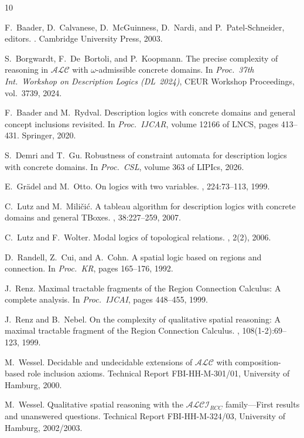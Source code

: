 \documentclass[a4paper,11pt]{article}
\theoremstyle{definition}
\begin{document}

\begin{thebibliography}{10}

F.~Baader, D.~Calvanese, D.~McGuinness, D.~Nardi, and P.~Patel-Schneider,
  editors.
.
\newblock Cambridge University Press, 2003.

S.~Borgwardt, F.~De~Bortoli, and P.~Koopmann.
\newblock The precise complexity of reasoning in {$\mathcal{ALC}$} with
  $\omega$-admissible concrete domains.
\newblock In {\em Proc.\ 37th Int.\ Workshop on Description Logics (DL~2024)},
  CEUR Workshop Proceedings, vol.\ 3739, 2024.

F.~Baader and M.~Rydval.
\newblock Description logics with concrete domains and general concept
  inclusions revisited.
\newblock In {\em Proc.\ IJCAR}, volume 12166 of LNCS, pages 413--431.
  Springer, 2020.

S.~Demri and T.~Gu.
\newblock Robustness of constraint automata for description logics with
  concrete domains.
\newblock In {\em Proc.\ CSL}, volume 363 of LIPIcs, 2026.

E.~Gr\"{a}del and M.~Otto.
\newblock On logics with two variables.
, 224:73--113, 1999.

C.~Lutz and M.~Mili\v{c}i\'{c}.
\newblock A tableau algorithm for description logics with concrete domains and
  general {TBoxes}.
, 38:227--259, 2007.

C.~Lutz and F.~Wolter.
\newblock Modal logics of topological relations.
, 2(2), 2006.

D.~Randell, Z.~Cui, and A.~Cohn.
\newblock A spatial logic based on regions and connection.
\newblock In {\em Proc.\ KR}, pages 165--176, 1992.

J.~Renz.
\newblock Maximal tractable fragments of the {Region Connection Calculus}: A
  complete analysis.
\newblock In {\em Proc.\ IJCAI}, pages 448--455, 1999.

J.~Renz and B.~Nebel.
\newblock On the complexity of qualitative spatial reasoning: A maximal
  tractable fragment of the {Region Connection Calculus}.
, 108(1-2):69--123, 1999.

M.~Wessel.
\newblock Decidable and undecidable extensions of {$\mathcal{ALC}$} with
  composition-based role inclusion axioms.
\newblock Technical Report FBI-HH-M-301/01, University of Hamburg, 2000.

M.~Wessel.
\newblock Qualitative spatial reasoning with the {$\mathcal{ALCI}_\mathit{RCC}$}
  family---{F}irst results and unanswered questions.
\newblock Technical Report FBI-HH-M-324/03, University of Hamburg, 2002/2003.

\end{thebibliography}
\end{document}
